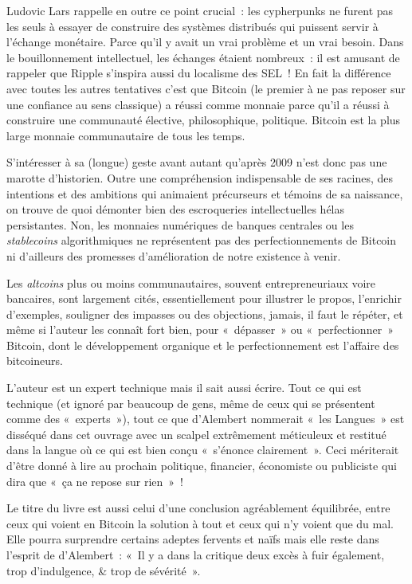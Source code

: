 Ludovic Lars rappelle en outre ce point crucial~: les cypherpunks ne furent pas les seuls à essayer de construire des systèmes distribués qui puissent servir à l'échange monétaire. Parce qu'il y avait un vrai problème et un vrai besoin. Dans le bouillonnement intellectuel, les échanges étaient nombreux~: il est amusant de rappeler que Ripple s'inspira aussi du localisme des SEL~! En fait la différence avec toutes les autres tentatives c'est que Bitcoin (le premier à ne pas reposer sur une confiance au sens classique) a réussi comme monnaie parce qu'il a réussi à construire une communauté élective, philosophique, politique. Bitcoin est la plus large monnaie communautaire de tous les temps.

S'intéresser à sa (longue) geste avant autant qu'après 2009 n'est donc pas une marotte d'historien. Outre une compréhension indispensable de ses racines, des intentions et des ambitions qui animaient précurseurs et témoins de sa naissance, on trouve de quoi démonter bien des escroqueries intellectuelles hélas persistantes. Non, les monnaies numériques de banques centrales ou les \emph{stablecoins} algorithmiques ne représentent pas des perfectionnements de Bitcoin ni d'ailleurs des promesses d'amélioration de notre existence à venir.

Les \emph{altcoins} plus ou moins communautaires, souvent entrepreneuriaux voire bancaires, sont largement cités, essentiellement pour illustrer le propos, l'enrichir d'exemples, souligner des impasses ou des objections, jamais, il faut le répéter, et même si l'auteur les connaît fort bien, pour «~dépasser~» ou «~perfectionner~» Bitcoin, dont le développement organique et le perfectionnement est l'affaire des bitcoineurs.

L'auteur est un expert technique mais il sait aussi écrire. Tout ce qui est technique (et ignoré par beaucoup de gens, même de ceux qui se présentent comme des «~experts~»), tout ce que d'Alembert nommerait «~les Langues~» est disséqué dans cet ouvrage avec un scalpel extrêmement méticuleux et restitué dans la langue où ce qui est bien conçu «~s'énonce clairement~». Ceci mériterait d'être donné à lire au prochain politique, financier, économiste ou publiciste qui dira que «~ça ne repose sur rien~»~!

Le titre du livre est aussi celui d'une conclusion agréablement équilibrée, entre ceux qui voient en Bitcoin la solution à tout et ceux qui n'y voient que du mal. Elle pourra surprendre certains adeptes fervents et naïfs mais elle reste dans l'esprit de d'Alembert~: «~Il y a dans la critique deux excès à fuir également, trop d'indulgence, \& trop de sévérité~».


